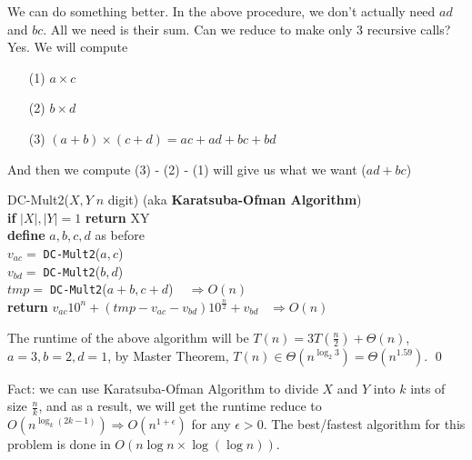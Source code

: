 \documentclass[twoside]{article}
\newcommand{\pc}[1]{\mbox{\textbf{#1}}} %
\begin{document}
We can do something better. In the above procedure, we don't actually need $ad$ and $bc$. All we need is their sum. Can we reduce to make only 3 recursive calls? Yes. We will compute 
\begin{enumerate}
	\item [(1)]$a \times c$
	\item [(2)]$b \times d$
	\item [(3)]$(a + b) \times (c + d) = ac + ad + bc + bd$
\end{enumerate}
And then we compute (3) - (2) - (1) will give us what we want ($ad + bc$)
\begin{algorithme}
	DC-Mult2($X, Y\; n$ digit) (aka \textbf{Karatsuba-Ofman Algorithm})\\
	\> \pc{if} $|X|,|Y| = 1$ \pc{return} XY\\
	\>\pc{define} $a,b,c,d$ as before\\
	\>$v_{ac} = \;$\texttt{DC-Mult2}($a,c$)\\
	\>$v_{bd} = \;$\texttt{DC-Mult2}($b,d$)\\
	\>$tmp = \;$\texttt{DC-Mult2}($a+b,c+d$) $\;\;\;\Rightarrow O(n)$\\
	\>\pc{return} $v_{ac}10^n +(tmp - v_{ac}-v_{bd})10^{\frac{n}{2}}+ v_{bd}$$\;\;\;\Rightarrow O(n)$
\end{algorithme}
The runtime of the above algorithm will be $T(n) = 3T(\frac{n}{2}) + \Theta(n)$, $a = 3, b =2, d = 1$, by Master Theorem, $T(n) \in \Theta(n^{\log_2 3}) = \Theta(n^{1.59})$. \qed

Fact: we can use Karatsuba-Ofman Algorithm to divide $X$ and $Y$ into $k$ ints of size $\frac{n}{k}$, and as a result, we will get the runtime reduce to $O(n^{\log_k(2k-1)}) \Rightarrow O(n^{1+\epsilon})$ for any $\epsilon > 0$. The best/fastest algorithm for this problem is done in $O(n\log n \times \log (\log n))$. 
\end{document}
